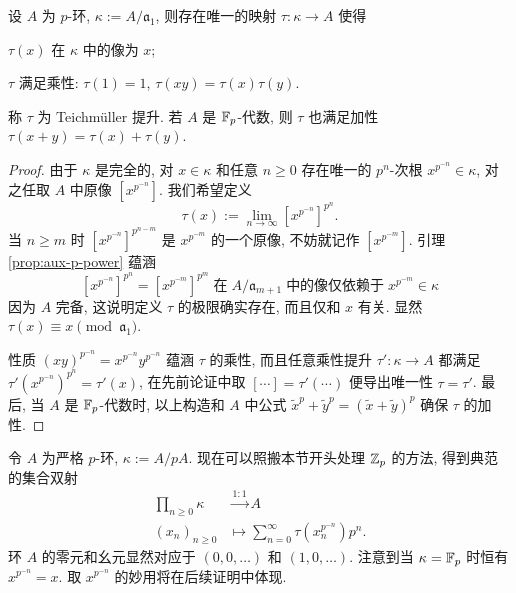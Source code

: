 \begin{proposition}\label{prop:Teichmuller-lift}
	设 $A$ 为 $p$-环, $\kappa := A/\mathfrak{a}_1$, 则存在唯一的映射 $\tau: \kappa \to A$ 使得
	\begin{compactitem}
		\item $\tau(x)$ 在 $\kappa$ 中的像为 $x$;
		\item $\tau$ 满足乘性: $\tau(1)=1$, $\tau(xy)=\tau(x)\tau(y)$.
	\end{compactitem}
	称 $\tau$ 为 Teichmüller 提升. 若 $A$ 是 $\mathbb{F}_p$-代数, 则 $\tau$ 也满足加性 $\tau(x+y)=\tau(x)+\tau(y)$.
\end{proposition}
\begin{proof}
	由于 $\kappa$ 是完全的, 对 $x \in \kappa$ 和任意 $n \geq 0$ 存在唯一的 $p^n$-次根 $x^{p^{-n}} \in \kappa$, 对之任取 $A$ 中原像 $\left[ x^{p^{-n}} \right]$. 我们希望定义
	\[ \tau(x) := \lim_{n \to \infty} \left[ x^{p^{-n}} \right]^{p^n}. \]
	当 $n \geq m$ 时 $\left[ x^{p^{-n}} \right]^{p^{n-m}}$ 是 $x^{p^{-m}}$ 的一个原像, 不妨就记作 $\left[ x^{p^{-m}} \right]$. 引理 \ref{prop:aux-p-power} 蕴涵
	\[ \left[ x^{p^{-n}} \right]^{p^n} = \left[ x^{p^{-m}} \right]^{p^m} \;\text{在}\; A/\mathfrak{a}_{m+1}\; \text{中的像仅依赖于}\; x^{p^{-m}} \in \kappa \]
	因为 $A$ 完备, 这说明定义 $\tau$ 的极限确实存在, 而且仅和 $x$ 有关. 显然 $\tau(x) \equiv x \pmod{\mathfrak{a}_1}$.

	性质 $(xy)^{p^{-n}} = x^{p^{-n}} y^{p^{-n}}$ 蕴涵 $\tau$ 的乘性, 而且任意乘性提升 $\tau': \kappa \to A$ 都满足 $\tau'( x^{p^{-n}})^{p^n} = \tau'(x)$, 在先前论证中取 $\left[ \cdots \right] = \tau'(\cdots)$ 便导出唯一性 $\tau=\tau'$. 最后, 当 $A$ 是 $\mathbb{F}_p$-代数时, 以上构造和 $A$ 中公式 $\tilde{x}^p + \tilde{y}^p = (\tilde{x}+\tilde{y})^p$ 确保 $\tau$ 的加性.
\end{proof}

令 $A$ 为严格 $p$-环, $\kappa := A/pA$. 现在可以照搬本节开头处理 $\mathbb{Z}_p$ 的方法, 得到典范的集合双射
\begin{equation}\label{eqn:Witt-bijection}\begin{aligned}
	\prod_{n \geq 0} \kappa & \stackrel{1:1}{\longrightarrow} A \\
	(x_n)_{n \geq 0} & \longmapsto \sum_{n=0}^\infty \tau\left( x_n^{p^{-n}} \right) p^n.
\end{aligned}\end{equation}
环 $A$ 的零元和幺元显然对应于 $(0,0,\ldots)$ 和 $(1, 0, \ldots)$. 注意到当 $\kappa = \mathbb{F}_p$ 时恒有 $x^{p^{-n}} = x$. 取 $x^{p^{-n}}$ 的妙用将在后续证明中体现.

